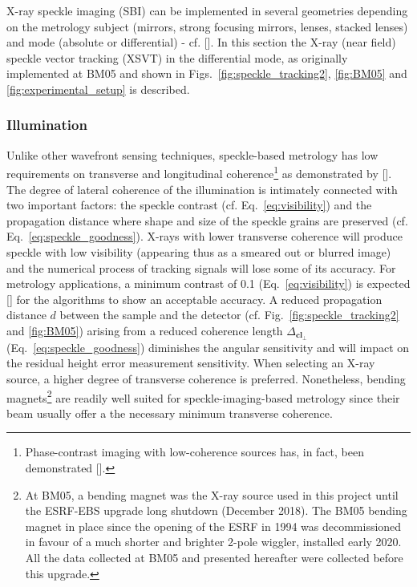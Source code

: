 \begin{refsection}
X-ray speckle imaging (SBI) can be implemented in several geometries depending on the metrology subject (mirrors, strong focusing mirrors, lenses, stacked lenses) and mode (absolute or differential) - cf. [\cite{Berujon2020a}]. In this section the X-ray (near field) speckle vector tracking (XSVT) in the differential mode, as originally implemented at BM05 and shown in Figs.~\ref{fig:speckle_tracking2}, \ref{fig:BM05} and \ref{fig:experimental_setup} is described.

\subsubsection*{Illumination}

Unlike other wavefront sensing techniques, speckle-based metrology has low requirements on transverse and longitudinal coherence\footnote{Phase-contrast imaging with low-coherence sources has, in fact, been demonstrated [\cite{Cloetens1996, Wilkins1996, Pfeiffer2006, Munro2012}].} as demonstrated by [\cite{Zanette2014,Zdora2015,Wang2016}]. The degree of lateral coherence of the illumination is intimately connected with two important factors: the speckle contrast (cf. Eq.~\ref{eq:visibility}) and the propagation distance where shape and size of the speckle grains are preserved (cf. Eq.~\ref{eq:speckle_goodness}). X-rays with lower transverse coherence will produce speckle with low visibility (appearing thus as a smeared out or blurred image) and the numerical process of tracking signals will lose some of its accuracy. For metrology applications, a minimum contrast of 0.1 (Eq.~\ref{eq:visibility}) is expected [\cite{Berujon2020a}] for the algorithms to show an acceptable accuracy. A reduced propagation distance $d$ between the sample and the detector (cf. Fig.~\ref{fig:speckle_tracking2} and \ref{fig:BM05}) arising from a reduced coherence length $\Delta_{\textbf{cl}_\perp}$ (Eq.~\ref{eq:speckle_goodness}) diminishes the angular sensitivity and will impact on the residual height error measurement sensitivity. When selecting an X-ray source, a higher degree of transverse coherence is preferred. Nonetheless, bending magnets\footnote{At BM05, a bending magnet was the X-ray source used in this project until the ESRF-EBS upgrade long shutdown (December 2018). The BM05 bending magnet in place since the opening of the ESRF in 1994 was decommissioned in favour of a much shorter and brighter 2-pole wiggler, installed early 2020. All the data collected at BM05 and presented hereafter were collected before this upgrade.} are readily well suited for speckle-imaging-based metrology since their beam usually offer a the necessary minimum transverse coherence. 


\end{refsection}
